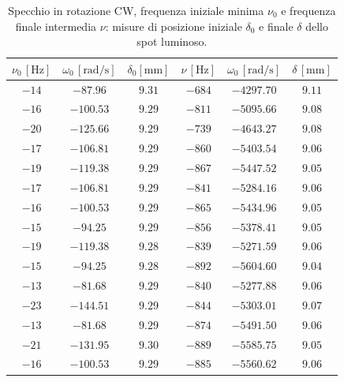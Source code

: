 \documentclass[]{article}
\begin{document}
    \begin{table}
        \centering
         \begin{tabular}{||c|c|c||c|c|c||}
            \hline
            $\nu_0\, [\text{Hz}] $ & $\omega_0\, [\text{rad/s}] $ & $\delta_0 [\text{mm}] $ & $\nu\, [\text{Hz}] $ & $\omega_0\, [\text{rad/s}] $ & $\delta\, [\text{mm}] $ \\
            \hline\hline
            $-14$ & $-87.96  $ & $9.31$ & $-684$ & $-4297.70$ & $9.11$\\\hline
            $-16$ & $-100.53 $ & $9.29$ & $-811$ & $-5095.66$ & $9.08$\\\hline
            $-20$ & $-125.66 $ & $9.29$ & $-739$ & $-4643.27$ & $9.08$\\\hline
            $-17$ & $-106.81 $ & $9.29$ & $-860$ & $-5403.54$ & $9.06$\\\hline
            $-19$ & $-119.38 $ & $9.29$ & $-867$ & $-5447.52$ & $9.05$\\\hline
            $-17$ & $-106.81 $ & $9.29$ & $-841$ & $-5284.16$ & $9.06$\\\hline
            $-16$ & $-100.53 $ & $9.29$ & $-865$ & $-5434.96$ & $9.05$\\\hline
            $-15$ & $-94.25  $ & $9.29$ & $-856$ & $-5378.41$ & $9.05$\\\hline
            $-19$ & $-119.38 $ & $9.28$ & $-839$ & $-5271.59$ & $9.06$\\\hline
            $-15$ & $-94.25  $ & $9.28$ & $-892$ & $-5604.60$ & $9.04$\\\hline
            $-13$ & $-81.68  $ & $9.29$ & $-840$ & $-5277.88$ & $9.06$\\\hline
            $-23$ & $-144.51 $ & $9.29$ & $-844$ & $-5303.01$ & $9.07$\\\hline
            $-13$ & $-81.68  $ & $9.29$ & $-874$ & $-5491.50$ & $9.06$\\\hline
            $-21$ & $-131.95 $ & $9.30$ & $-889$ & $-5585.75$ & $9.05$\\\hline
            $-16$ & $-100.53 $ & $9.29$ & $-885$ & $-5560.62$ & $9.06$\\\hline
        \end{tabular}
        \caption{Specchio in rotazione CW, frequenza iniziale minima $\nu_0$ e frequenza finale intermedia $\nu$: misure di posizione iniziale $\delta_0$ e finale $\delta$ dello spot luminoso.}
        \label{CW_min_mid-delta-omega}
    \end{table}
\end{document}
